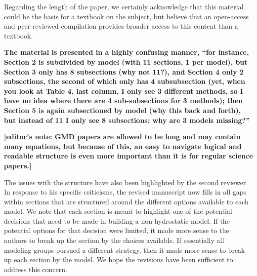\documentclass{article}
\begin{document}
Regarding the length of the paper, we certainly acknowledge that this material could be the basis for a textbook on the subject, but believe that an open-access and peer-reviewed compilation provides broader access to this content than a textbook.

\textbf{{The material is presented in a highly confusing manner, ``for instance, Section 2 is subdivided
by model (with 11 sections, 1 per model), but Section 3 only has 8 subsections
(why not 11?), and Section 4 only 2 subsections, the second of which only has 4 subsubsection
(yet, when you look at Table 4, last column, I only see 3 different methods,
so I have no idea where there are 4 sub-subsections for 3 methods); then Section 5 is
again subsectioned by model (why this back and forth), but instead of 11 I only see 8 subsections: why are 3 models missing?''}}

\textbf{{[editor's note: GMD papers are allowed to be long and may contain many equations,
but because of this, an easy to navigate logical and readable structure is even more
important than it is for regular science papers.]}}

The issues with the structure have also been highlighted by the second reviewer.  In response to his specific criticisms, the revised manuscript now fills in all gaps within sections that are structured around the different options available to each model.  We note that each section is meant to highlight one of the potential decisions that need to be made in building a non-hydrostatic model.  If the potential options for that decision were limited, it made more sense to the authors to break up the section by the choices available.  If essentially all modeling groups pursued a different strategy, then it made more sense to break up each section by the model.  We hope the revisions have been sufficient to address this concern.
\end{document}
